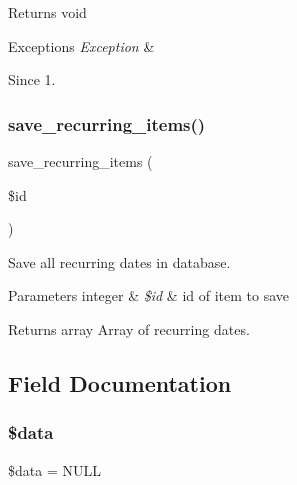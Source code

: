 \begin{DoxyReturn}{Returns}
void
\end{DoxyReturn}

\begin{DoxyExceptions}{Exceptions}
{\em Exception} & \\
\hline
\end{DoxyExceptions}
\begin{DoxySince}{Since}
1. 
\end{DoxySince}
\mbox{\label{classtks__agenda_controller_item_form_a1a05579800021a72a6d6e94e1c0ffbbc}} 
\subsubsection{save\+\_\+recurring\+\_\+items()}
{\footnotesize\ttfamily save\+\_\+recurring\+\_\+items (\begin{DoxyParamCaption}\item[{}]{\$id }\end{DoxyParamCaption})}

Save all recurring dates in database.


\begin{DoxyParams}[1]{Parameters}
integer & {\em \$id} & id of item to save \\
\hline
\end{DoxyParams}
\begin{DoxyReturn}{Returns}
array Array of recurring dates. 
\end{DoxyReturn}


\subsection{Field Documentation}
\mbox{\label{classtks__agenda_controller_item_form_a6efc15b5a2314dd4b5aaa556a375c6d6}} 
\subsubsection{\$data}
{\footnotesize\ttfamily \$data = N\+U\+LL}

